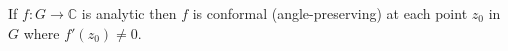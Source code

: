 If $f: G \to \mathbb{C}$ is analytic then $f$ is conformal (angle-preserving) at each point $z_0$ in $G$ where $f'(z_0) \neq 0$.